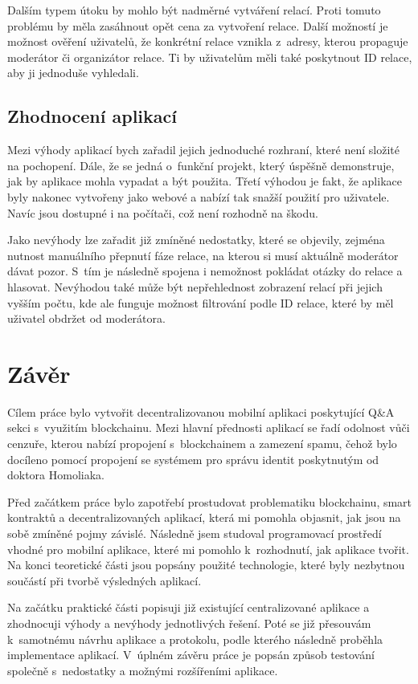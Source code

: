 Dalším typem útoku by mohlo být nadměrné vytváření relací. Proti tomuto problému by měla zasáhnout opět cena za vytvoření relace. Další možností je možnost ověření uživatelů, že konkrétní relace vznikla z~adresy, kterou propaguje moderátor či organizátor relace. Ti by uživatelům měli také poskytnout ID relace, aby ji jednoduše vyhledali.
\section{Zhodnocení aplikací}
Mezi výhody aplikací bych zařadil jejich jednoduché rozhraní, které není složité na pochopení. Dále, že se jedná o~funkční projekt, který úspěšně demonstruje, jak by aplikace mohla vypadat a být použita. Třetí výhodou je fakt, že aplikace byly nakonec vytvořeny jako webové a nabízí tak snažší použití pro uživatele. Navíc jsou dostupné i na počítači, což není rozhodně na škodu. 

Jako nevýhody lze zařadit již zmíněné nedostatky, které se objevily, zejména nutnost manuálního přepnutí fáze relace, na kterou si musí aktuálně moderátor dávat pozor. S~tím je následně spojena i nemožnost pokládat otázky do relace a hlasovat. Nevýhodou také může být nepřehlednost zobrazení relací při jejich vyšším počtu, kde ale funguje možnost filtrování podle ID relace, které by měl uživatel obdržet od moderátora.
\chapter{Závěr}
Cílem práce bylo vytvořit decentralizovanou mobilní aplikaci poskytující Q\&A sekci s~využitím blockchainu. Mezi hlavní přednosti aplikací se řadí odolnost vůči cenzuře, kterou nabízí propojení s~blockchainem a zamezení spamu, čehož bylo docíleno pomocí propojení se systémem pro správu identit poskytnutým od doktora Homoliaka.

Před začátkem práce bylo zapotřebí prostudovat problematiku blockchainu, smart kontraktů a decentralizovaných aplikací, která mi pomohla objasnit, jak jsou na sobě zmíněné pojmy závislé. Následně jsem studoval programovací prostředí vhodné pro mobilní aplikace, které mi pomohlo k~rozhodnutí, jak aplikace tvořit. Na konci teoretické části jsou popsány použité technologie, které byly nezbytnou součástí při tvorbě výsledných aplikací.

Na začátku praktické části popisuji již existující centralizované aplikace a zhodnocuji výhody a nevýhody jednotlivých řešení. Poté se již přesouvám k~samotnému návrhu aplikace a protokolu, podle kterého následně proběhla implementace aplikací. V~úplném závěru práce je popsán způsob testování společně s~nedostatky a možnými rozšířeními aplikace.

